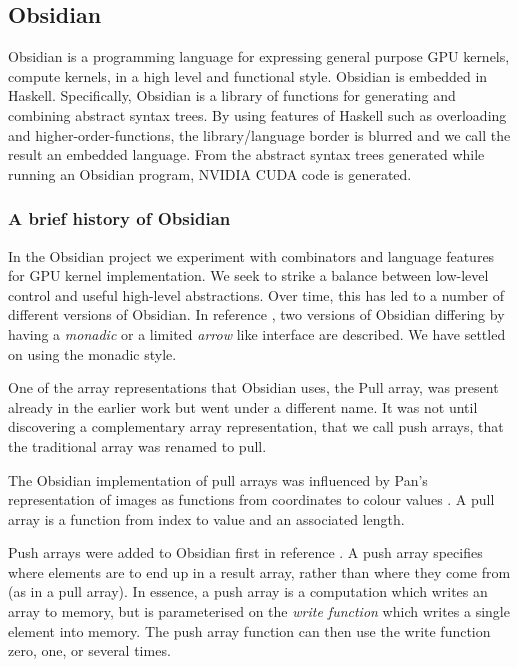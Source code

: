 \subsection{Obsidian} 
\label{sec:Obsidian} 

Obsidian is a programming language for expressing general purpose 
GPU kernels, compute kernels, in a high level and functional style.  
Obsidian is embedded in Haskell.
Specifically, Obsidian is a library of functions for generating 
and combining abstract syntax trees.
By using features of Haskell such as overloading and higher-order-functions, 
the library/language border is blurred and we call the result an embedded 
language. From the abstract syntax trees generated while running an 
Obsidian program, NVIDIA CUDA code is generated. 


\subsubsection{A brief history of Obsidian} 
\label{sec:OBSHist}

In the Obsidian project we experiment with combinators and language 
features for GPU kernel implementation. We seek to strike a balance 
between low-level control and useful high-level abstractions. Over time, this 
has led to a number of different versions of Obsidian. In reference \cite{JSLIC}, 
two versions of Obsidian differing by having a {\em monadic} or a limited {\em arrow} 
like interface are described. We have settled on using the monadic style. 

One of the array representations that Obsidian uses, the Pull array, was present already 
in the earlier work but went under a different name. It was not until discovering 
a complementary array representation, that we call push arrays, that the traditional 
array was renamed to pull. 

The Obsidian implementation of pull arrays was influenced by Pan's representation 
of images as functions from coordinates to colour values \cite{PAN}. A pull array 
is a function from index to value and an associated length.  

Push arrays were added to Obsidian first in reference \cite{Obsidian-Expressive}. A push array
specifies where elements are to end up in a result array, rather than where 
they come from (as in a pull array). In essence, a push array is a
computation which writes an array to memory, but is parameterised on
the {\em write function} which writes a single element into memory.
The push array function can then 
use the write function zero, one, or several times. 

